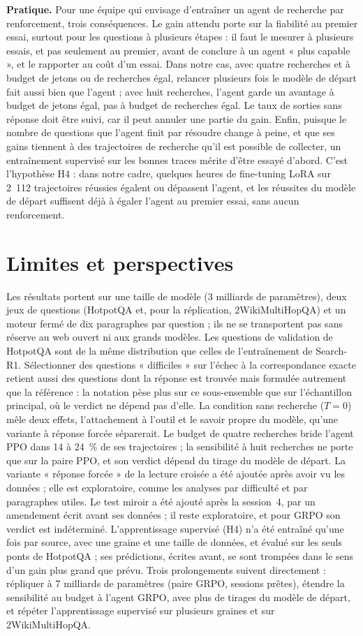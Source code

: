 \textbf{Pratique.} Pour une équipe qui envisage d'entraîner un agent de recherche par renforcement, trois conséquences. Le gain attendu porte sur la fiabilité au premier essai, surtout pour les questions à plusieurs étapes : il faut le mesurer à plusieurs essais, et pas seulement au premier, avant de conclure à un agent « plus capable », et le rapporter au coût d'un essai. Dans notre cas, avec quatre recherches et à budget de jetons ou de recherches égal, relancer plusieurs fois le modèle de départ fait aussi bien que l'agent ; avec huit recherches, l'agent garde un avantage à budget de jetons égal, pas à budget de recherches égal. Le taux de sorties sans réponse doit être suivi, car il peut annuler une partie du gain. Enfin, puisque le nombre de questions que l'agent finit par résoudre change à peine, et que ses gains tiennent à des trajectoires de recherche qu'il est possible de collecter, un entraînement supervisé sur les bonnes traces mérite d'être essayé d'abord. C'est l'hypothèse H4 : dans notre cadre, quelques heures de fine-tuning LoRA sur 2~112 trajectoires réussies égalent ou dépassent l'agent, et les réussites du modèle de départ suffisent déjà à égaler l'agent au premier essai, sans aucun renforcement.

\section{Limites et perspectives}
Les résultats portent sur une taille de modèle (3 milliards de paramètres), deux jeux de questions (HotpotQA et, pour la réplication, 2WikiMultiHopQA) et un moteur fermé de dix paragraphes par question ; ils ne se transportent pas sans réserve au web ouvert ni aux grands modèles. Les questions de validation de HotpotQA sont de la même distribution que celles de l'entraînement de Search-R1. Sélectionner des questions « difficiles » sur l'échec à la correspondance exacte retient aussi des questions dont la réponse est trouvée mais formulée autrement que la référence : la notation pèse plus sur ce sous-ensemble que sur l'échantillon principal, où le verdict ne dépend pas d'elle. La condition sans recherche ($T = 0$) mêle deux effets, l'attachement à l'outil et le savoir propre du modèle, qu'une variante à réponse forcée séparerait. Le budget de quatre recherches bride l'agent PPO dans 14 à 24~\% de ses trajectoires ; la sensibilité à huit recherches ne porte que sur la paire PPO, et son verdict dépend du tirage du modèle de départ. La variante « réponse forcée » de la lecture croisée a été ajoutée après avoir vu les données ; elle est exploratoire, comme les analyses par difficulté et par paragraphes utiles. Le test miroir a été ajouté après la session~4, par un amendement écrit avant ses données ; il reste exploratoire, et pour GRPO son verdict est indéterminé. L'apprentissage supervisé (H4) n'a été entraîné qu'une fois par source, avec une graine et une taille de données, et évalué sur les seuls ponts de HotpotQA ; ses prédictions, écrites avant, se sont trompées dans le sens d'un gain plus grand que prévu. Trois prolongements suivent directement : répliquer à 7 milliards de paramètres (paire GRPO, sessions prêtes), étendre la sensibilité au budget à l'agent GRPO, avec plus de tirages du modèle de départ, et répéter l'apprentissage supervisé sur plusieurs graines et sur 2WikiMultiHopQA.
